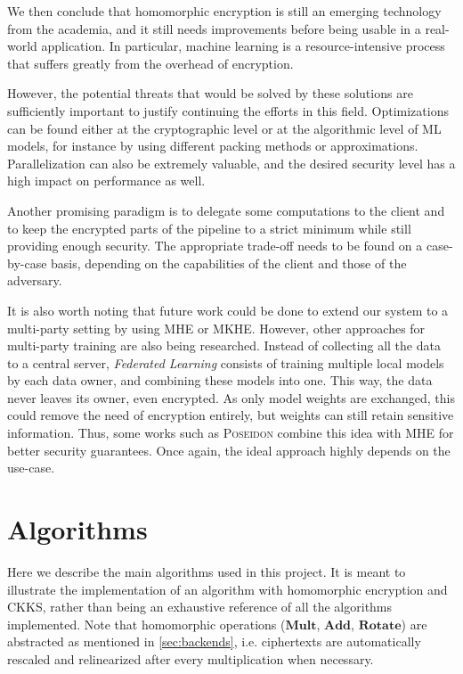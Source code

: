 \documentclass[a4paper,11pt,oneside]{report}
\begin{document}
We then conclude that homomorphic encryption is still an emerging technology from the academia, and it still needs improvements before being usable in a real-world application. 
In particular, machine learning is a resource-intensive process that suffers greatly from the overhead of encryption.

However, the potential threats that would be solved by these solutions are sufficiently important to justify continuing the efforts in this field.
Optimizations can be found either at the cryptographic level or at the algorithmic level of ML models, for instance by using different packing methods or approximations.
Parallelization can also be extremely valuable, and the desired security level has a high impact on performance as well.

Another promising paradigm is to delegate some computations to the client and to keep the encrypted parts of the pipeline to a strict minimum while still providing enough security. 
The appropriate trade-off needs to be found on a case-by-case basis, depending on the capabilities of the client and those of the adversary.

It is also worth noting that future work could be done to extend our system to a multi-party setting by using MHE or MKHE. 
However, other approaches for multi-party training are also being researched. 
Instead of collecting all the data to a central server, \emph{Federated Learning} consists of training multiple local models by each data owner, and combining these models into one.
This way, the data never leaves its owner, even encrypted.
As only model weights are exchanged, this could remove the need of encryption entirely, but weights can still retain sensitive information.
Thus, some works such as \textsc{Poseidon} \cite{sav_poseidon_2021} combine this idea with MHE for better security guarantees.
Once again, the ideal approach highly depends on the use-case. 


\cleardoublepage
{}
{}
\printbibliography

\appendix
\chapter{Algorithms}

Here we describe the main algorithms used in this project. 
It is meant to illustrate the implementation of an algorithm with homomorphic encryption and CKKS, rather than being an exhaustive reference of all the algorithms implemented. 
Note that homomorphic operations ($\mathbf{Mult}$, $\mathbf{Add}$, $\mathbf{Rotate}$) are abstracted as mentioned in \autoref{sec:backends}, i.e. ciphertexts are automatically rescaled and relinearized after every multiplication when necessary.
\end{document}
